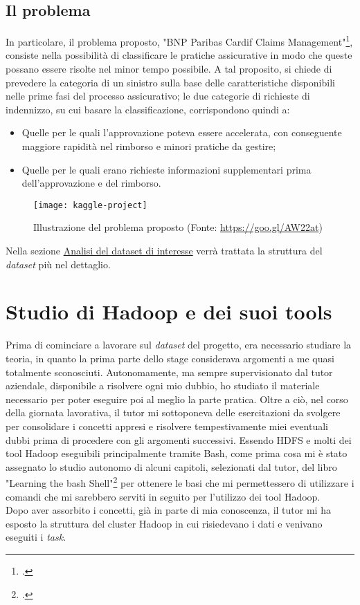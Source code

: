 \subsection{Il problema}
In particolare, il problema proposto, "BNP Paribas Cardif Claims Management"\footcite{https://www.kaggle.com/c/bnp-paribas-cardif-claims-management}, consiste nella possibilità di classificare le pratiche assicurative in modo che queste possano essere risolte nel minor tempo possibile. A tal proposito, si chiede di prevedere la categoria di un sinistro sulla base delle caratteristiche disponibili nelle prime fasi del processo assicurativo; le due categorie di richieste di indennizzo, su cui basare la classificazione, corrispondono quindi a:
\begin{itemize}
	\item Quelle per le quali l'approvazione poteva essere accelerata, con conseguente maggiore rapidità nel rimborso e minori pratiche da gestire;
	\item Quelle per le quali erano richieste informazioni supplementari prima dell'approvazione e del rimborso.
\end{itemize}
\clearpage
\begin{figure}[!h] 
	\centering 
	\texttt{[image: kaggle-project]}
	\caption{Illustrazione del problema proposto (Fonte: \href{https://goo.gl/AW22at}{https://goo.gl/AW22at})}
\end{figure}
Nella sezione \hyperref[dataset]{Analisi del dataset di interesse} verrà trattata la struttura del \textit{dataset} più nel dettaglio.


\section{Studio di Hadoop e dei suoi tools}
Prima di cominciare a lavorare sul \textit{dataset} del progetto, era necessario studiare la teoria, in quanto la prima parte dello stage considerava argomenti a me quasi totalmente sconosciuti.
Autonomamente, ma sempre supervisionato dal tutor aziendale, disponibile a risolvere ogni mio dubbio, ho studiato il materiale necessario per poter eseguire poi al meglio la parte pratica. Oltre a ciò, nel corso della giornata lavorativa, il tutor mi sottoponeva delle esercitazioni da svolgere per consolidare i concetti appresi e risolvere tempestivamente miei eventuali dubbi prima di procedere con gli argomenti successivi.
Essendo \gls{HDFS} e molti dei tool Hadoop eseguibili principalmente tramite \gls{Bash}, come prima cosa mi è stato assegnato lo studio autonomo di alcuni capitoli, selezionati dal tutor, del libro "Learning the bash Shell"\footcite{http://shop.oreilly.com/product/9780596009656.do} per ottenere le basi che mi permettessero di utilizzare i comandi che mi sarebbero serviti in seguito per l'utilizzo dei tool Hadoop.\\
Dopo aver assorbito i concetti, già in parte di mia conoscenza, il tutor mi ha esposto la struttura del \gls{cluster} Hadoop in cui risiedevano i dati e venivano eseguiti i \textit{task}. 
